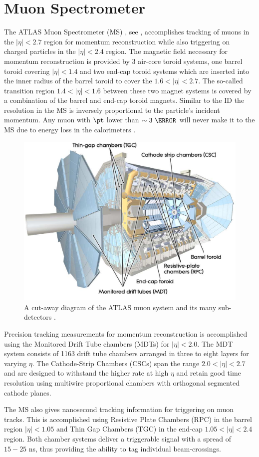 \section{Muon Spectrometer} \label{sec:atlas:muons}

The ATLAS Muon Spectrometer (MS) \cite{PERF-2007-01}, see
, accomplishes tracking of muons in the $|\eta| < 2.7$
region for momentum reconstruction while also triggering on charged particles
in the $|\eta| < 2.4$ region.  The magnetic field necessary for momentum
reconstruction is provided by 3 air-core toroid systems, one barrel toroid
covering $|\eta| < 1.4$ and two end-cap toroid systems which are inserted into
the inner radius of the barrel toroid to cover the $1.6 < |\eta| < 2.7$. The
so-called transition region $1.4 < |\eta| < 1.6$ between these two magnet
systems is covered by a combination of the barrel and end-cap toroid magnets.
Similar to the ID the resolution in the MS is inversely proportional to the particle's
incident momentum.  Any muon with $\pt$ lower than $\sim 3~\GeV$ will never
make it to the MS due to energy loss in the calorimeters \cite{PERF-2007-01}.

\begin{figure}[!htbp]
  \begin{center}
    \includegraphics[width=0.8\linewidth]{figures/atlas/muon_system}
    \caption{A cut-away diagram of the ATLAS muon system
and its many sub-detectors \cite{PERF-2007-01}.}
    \label{fig:muon_system}
  \end{center}
\end{figure}

Precision tracking measurements for momentum reconstruction is accomplished
using the Monitored Drift Tube chambers (MDTs) for $|\eta| < 2.0$.  The MDT
system consists of 1163 drift tube chambers arranged in three to eight layers
for varying $\eta$.  The Cathode-Strip Chambers (CSCs) span the range $2.0 <
|\eta| < 2.7$ and are designed to withstand the higher rate at high $\eta$ and
retain good time resolution using multiwire proportional chambers with
orthogonal segmented cathode planes.

The MS also gives nanosecond tracking information for triggering on muon tracks.
This is accomplished using Resistive Plate Chambers (RPC) in the barrel region
$|\eta| < 1.05$ and Thin Gap Chambers (TGC) in the end-cap $1.05 < |\eta| < 2.4$
region.  Both chamber systems deliver a triggerable signal with a spread of
$15-25$ ns, thus providing the ability to tag individual beam-crossings.
